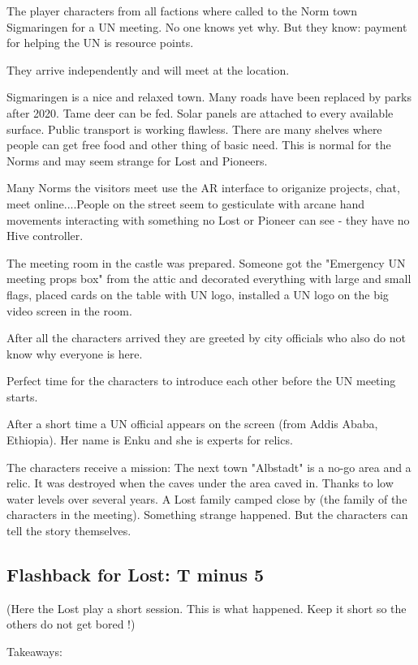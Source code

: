 The player characters from all factions where called to the Norm town Sigmaringen for a UN meeting. No one knows yet why. But they know: payment for helping the UN is resource points.

They arrive independently and will meet at the location.

Sigmaringen is a nice and relaxed town. Many roads have been replaced by parks after 2020. Tame deer can be fed. Solar panels are attached to every available surface. Public transport is working flawless. There are many shelves where people can get free food and other thing of basic need. This is normal for the Norms and may seem strange for Lost and Pioneers.

Many Norms the visitors meet use the AR interface to origanize projects, chat, meet online....People on the street seem to gesticulate with arcane hand movements interacting with something no Lost or Pioneer can see - they have no Hive controller.

The meeting room in the castle was prepared. Someone got the "Emergency UN meeting props box" from the attic and decorated everything with large and small flags, placed cards on the table with UN logo, installed a UN logo on the big video screen in the room.

After all the characters arrived they are greeted by city officials who also do not know why everyone is here.

Perfect time for the characters to introduce each other before the UN meeting starts.

After a short time a UN official appears on the screen (from Addis Ababa, Ethiopia). Her name is Enku and she is experts for relics.

The characters receive a mission:
The next town "Albstadt" is a no-go area and a relic. It was destroyed when the caves under the area caved in. Thanks to low water levels over several years. A Lost family camped close by (the family of the characters in the meeting). Something strange happened. But the characters can tell the story themselves.

\subsection{Flashback for Lost: T minus 5}

(Here the Lost play a short session. This is what happened. Keep it short so the others do not get bored !)

Takeaways:

